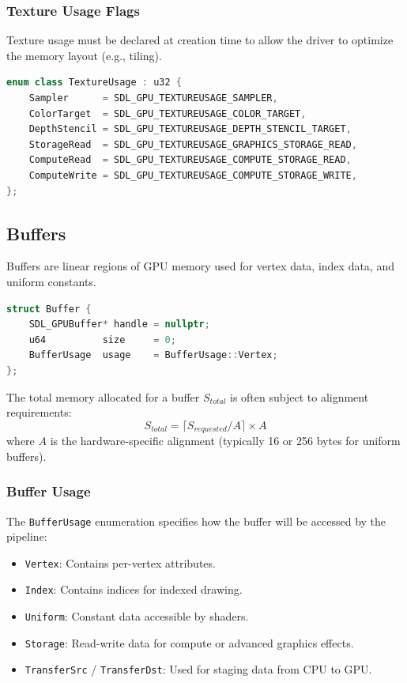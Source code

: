 \subsubsection{Texture Usage Flags}

Texture usage must be declared at creation time to allow the driver to optimize the memory layout (e.g., tiling).

\begin{lstlisting}[language=C++]
enum class TextureUsage : u32 {
    Sampler      = SDL_GPU_TEXTUREUSAGE_SAMPLER,
    ColorTarget  = SDL_GPU_TEXTUREUSAGE_COLOR_TARGET,
    DepthStencil = SDL_GPU_TEXTUREUSAGE_DEPTH_STENCIL_TARGET,
    StorageRead  = SDL_GPU_TEXTUREUSAGE_GRAPHICS_STORAGE_READ,
    ComputeRead  = SDL_GPU_TEXTUREUSAGE_COMPUTE_STORAGE_READ,
    ComputeWrite = SDL_GPU_TEXTUREUSAGE_COMPUTE_STORAGE_WRITE,
};
\end{lstlisting}

\subsection{Buffers}

Buffers are linear regions of GPU memory used for vertex data, index data, and uniform constants.

\begin{lstlisting}[language=C++]
struct Buffer {
    SDL_GPUBuffer* handle = nullptr;
    u64          size     = 0;
    BufferUsage  usage    = BufferUsage::Vertex;
};
\end{lstlisting}

The total memory allocated for a buffer $S_{total}$ is often subject to alignment requirements:
\begin{equation}
    S_{total} = \lceil S_{requested} / A \rceil \times A
\end{equation}
where $A$ is the hardware-specific alignment (typically 16 or 256 bytes for uniform buffers).

\subsubsection{Buffer Usage}

The \texttt{BufferUsage} enumeration specifies how the buffer will be accessed by the pipeline:
\begin{itemize}
    \item \texttt{Vertex}: Contains per-vertex attributes.
    \item \texttt{Index}: Contains indices for indexed drawing.
    \item \texttt{Uniform}: Constant data accessible by shaders.
    \item \texttt{Storage}: Read-write data for compute or advanced graphics effects.
    \item \texttt{TransferSrc} / \texttt{TransferDst}: Used for staging data from CPU to GPU.
\end{itemize}

